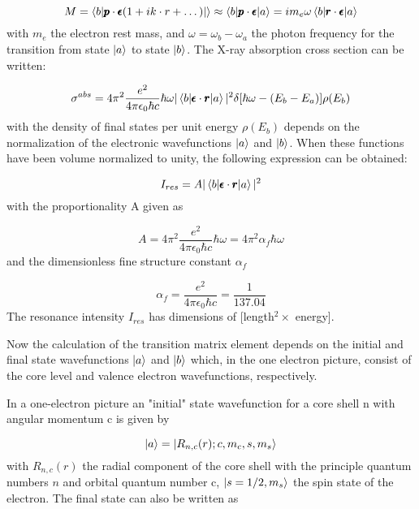 \begin{equation}
M = \braket{b|\pmb{p}\cdot\pmb{\epsilon}(1+ik\cdot r + \dots)|} \approx \braket{b|\pmb{p}\cdot \pmb{\epsilon} |a} = i m_e \omega \braket{b|\pmb{r} \cdot \pmb{\epsilon} |a}
\end{equation}
with $m_e$ the electron rest mass, and $\omega=\omega_b-\omega_a$ the photon frequency for the transition from state $\ket{a}$ to state $\ket{b}$. The X-ray absorption cross section can be written:

\begin{equation}
\sigma^{abs} = 4\pi^2\frac{e^2}{4\pi\epsilon_0\hbar c}\hbar \omega |\braket{b|\pmb{\epsilon}\cdot \pmb{r}|a}|^2\delta[\hbar\omega-(E_b-E_a)]\rho(E_b)
\end{equation}
with the density of final states per unit energy $\rho(E_b)$ depends on the normalization of the electronic wavefunctions $\ket{a}$ and $\ket{b}$. When these functions have been volume normalized to unity, the following expression can be obtained:

\begin{equation}
I_{res} = A|\braket{b|\pmb{\epsilon} \cdot \pmb{r}|a}|^2
\end{equation}
with the proportionality A given as

\begin{equation}
A=4\pi^2\frac{e^2}{4\pi\epsilon_0\hbar c}\hbar\omega = 4\pi^2 \alpha_f \hbar \omega
\end{equation}
and the dimensionless fine structure constant $\alpha_f$

\begin{equation}
\alpha_f=\frac{e^2}{4\pi\epsilon_0\hbar c} = \frac{1}{137.04}
\end{equation}
The resonance intensity $I_{res}$ has dimensions of [length$^2 \times$ energy].

Now the calculation of the transition matrix element depends on the initial and final state wavefunctions $\ket{a}$ and $\ket{b}$ which, in the one electron picture, consist of the core level and valence electron wavefunctions, respectively.

In a one-electron picture an "initial" state wavefunction for a core shell n with angular momentum c is given by

\begin{equation}
\ket{a}=\ket{R_{n,c}(r);c,m_c,s,m_s}
\end{equation}
with $R_{n,c}(r)$ the radial component of the core shell with the principle quantum numbers $n$ and orbital quantum number c, $\ket{s=1/2,m_s}$ the spin state of the electron. The final state can also be written as

